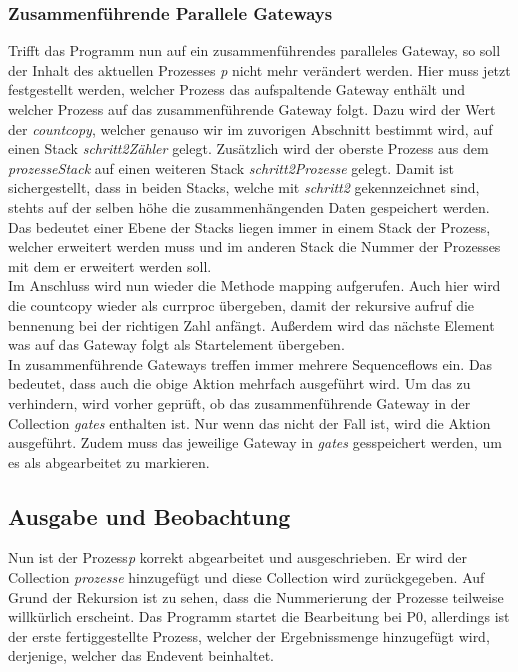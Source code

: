 \subsubsection{Zusammenführende Parallele Gateways}\label{Zusammenführende Parallele Gateways}
Trifft das Programm nun auf ein zusammenführendes paralleles Gateway, so soll der Inhalt des aktuellen Prozesses \textit{p} nicht mehr verändert werden. Hier muss jetzt festgestellt werden, welcher Prozess das aufspaltende Gateway enthält und welcher Prozess auf das zusammenführende Gateway folgt. Dazu wird der Wert der \textit{countcopy}, welcher genauso wir im zuvorigen Abschnitt bestimmt wird, auf einen Stack \textit{schritt2Zähler} gelegt. Zusätzlich wird der oberste Prozess aus dem \textit{prozesseStack} auf einen weiteren Stack \textit{schritt2Prozesse} gelegt. Damit ist sichergestellt, dass in beiden Stacks, welche mit \textit{schritt2} gekennzeichnet sind, stehts auf der selben höhe die zusammenhängenden Daten gespeichert werden. Das bedeutet einer Ebene der Stacks liegen immer in einem Stack der Prozess, welcher erweitert werden muss und im anderen Stack die Nummer der Prozesses mit dem er erweitert werden soll.\\
Im Anschluss wird nun wieder die Methode mapping aufgerufen. Auch hier wird die countcopy wieder als currproc übergeben, damit der rekursive aufruf die bennenung bei der richtigen Zahl anfängt. Außerdem wird das nächste Element was auf das Gateway folgt als Startelement übergeben.\\
In zusammenführende Gateways treffen immer mehrere Sequenceflows ein. Das bedeutet, dass auch die obige Aktion mehrfach ausgeführt wird. Um das zu verhindern, wird vorher geprüft, ob das zusammenführende Gateway in der Collection \textit{gates} enthalten ist. Nur wenn das nicht der Fall ist, wird die Aktion ausgeführt. Zudem muss das jeweilige Gateway in \textit{gates} gesspeichert werden, um es als abgearbeitet zu markieren.
\subsection{Ausgabe und Beobachtung}\label{Ausgabe und Beobachtung}
Nun ist der Prozess\textit{p} korrekt abgearbeitet und ausgeschrieben. Er wird der Collection \textit{prozesse} hinzugefügt und diese Collection wird zurückgegeben. Auf Grund der Rekursion ist zu sehen, dass die Nummerierung der Prozesse teilweise willkürlich erscheint. Das Programm startet die Bearbeitung bei P0, allerdings ist der erste fertiggestellte Prozess, welcher der Ergebnissmenge hinzugefügt wird, derjenige, welcher das Endevent beinhaltet.












